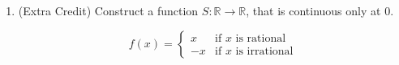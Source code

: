 \documentclass[12pt]{amsart}
\begin{document}
\begin{enumerate}
\addtocounter{enumi}{1}

\item (Extra Credit) Construct a function $S : \mathbb{R}\rightarrow \mathbb{R}$, 
that is continuous only at $0$. 
%

\begin{equation*}
f(x)= 
\begin{cases}
x  &\text{if $x$ is rational} \\
-x &\text{if $x$ is irrational}
\end{cases}
\end{equation*}

\end{enumerate} 
\end{document}
